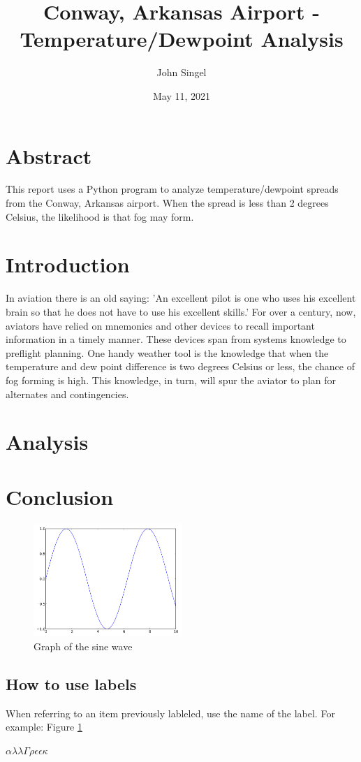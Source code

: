 \documentclass{article}
\title{Conway, Arkansas Airport - Temperature/Dewpoint Analysis}
\author{John Singel}\date{May 11, 2021}
\begin{document}
\maketitle

\section{Abstract}
This report uses a Python program to analyze temperature/dewpoint spreads from the Conway, Arkansas airport. When the spread is less than 2 degrees Celsius, the likelihood is that fog may form.

\section{Introduction}
In aviation there is an old saying: 'An excellent pilot is one who uses his excellent brain so that he does not have to use his excellent skills.' For over a century, now, aviators have relied on mnemonics and other devices to recall important information in a timely manner. These devices span from systems knowledge to preflight planning. One handy weather tool is the knowledge that when the temperature and dew point difference is two degrees Celsius or less, the chance of fog forming is high. This knowledge, in turn, will spur the aviator to plan for alternates and contingencies.

\section{Analysis}

\section{Conclusion}
\begin{figure}[h]
\begin{center}
\includegraphics[width=0.5\textwidth]{fig3-1.png}
\end{center}
\caption{Graph of the sine wave}
\label{fig: 3-1}
\end{figure}

\subsection{How to use labels}
When referring to an item previously lableled, use the name of the label. For example: Figure  \ref{fig: 3-1}

$\alpha\lambda\lambda  \Gamma\rho\epsilon\epsilon\kappa$
\end{document}
